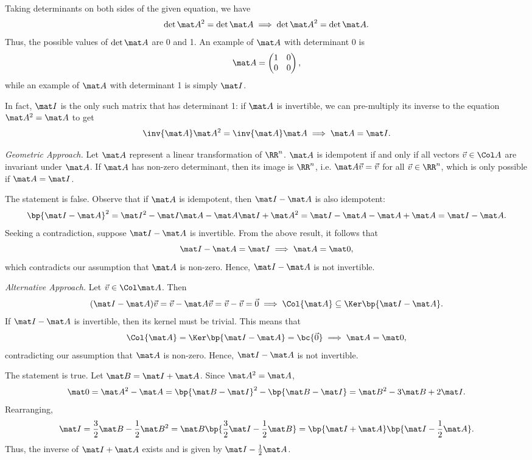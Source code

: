 \begin{solution}
    \begin{ppart}
        Taking determinants on both sides of the given equation, we have \[\det{\mat A^2} = \det{\mat A} \implies \det{\mat A}^2 = \det{\mat A}.\] Thus, the possible values of $\det{\mat A}$ are 0 and 1. An example of $\mat A$ with determinant 0 is \[\mat A = \begin{pmatrix}1 & 0 \\ 0 & 0\end{pmatrix},\] while an example of $\mat A$ with determinant 1 is simply $\mat I$.

        In fact, $\mat I$ is the only such matrix that has determinant 1: if $\mat A$ is invertible, we can pre-multiply its inverse to the equation $\mat A^2 = \mat A$ to get \[\inv{\mat A} \mat A^2 = \inv{\mat A} \mat A \implies \mat A = \mat I.\]
        
        \noindent\textit{Geometric Approach.} Let $\mat A$ represent a linear transformation of $\RR^n$. $\mat A$ is idempotent if and only if all vectors $\vec v \in \Col A$ are invariant under $\mat A$. If $\mat A$ has non-zero determinant, then its image is $\RR^n$, i.e. $\mat A \vec v = \vec v$ for all $\vec v \in \RR^n$, which is only possible if $\mat A = \mat I$.

        \begin{psubpart}
            The statement is false. Observe that if $\mat A$ is idempotent, then $\mat I - \mat A$ is also idempotent: \[\bp{\mat I - \mat A}^2 = \mat I^2 - \mat I \mat A - \mat A \mat I + \mat A^2 = \mat I - \mat A - \mat A + \mat A = \mat I - \mat A.\] Seeking a contradiction, suppose $\mat I - \mat A$ is invertible. From the above result, it follows that \[\mat I - \mat A = \mat I \implies \mat A = \mat 0,\] which contradicts our assumption that $\mat A$ is non-zero. Hence, $\mat I - \mat A$ is not invertible.

            \noindent\textit{Alternative Approach.} Let $\vec v \in \Col \mat A$. Then \[(\mat I - \mat A) \vec v = \vec v - \mat A \vec v = \vec v - \vec v = \vec 0 \implies \Col{\mat A} \subseteq \Ker \bp{\mat I - \mat A}.\] If $\mat I - \mat A$ is invertible, then its kernel must be trivial. This means that \[\Col{\mat A} = \Ker \bp{\mat I - \mat A} = \bc{\vec 0} \implies \mat A = \mat 0,\] contradicting our assumption that $\mat A$ is non-zero. Hence, $\mat I - \mat A$ is not invertible.
        \end{psubpart}
        \begin{psubpart}
            The statement is true. Let $\mat B = \mat I + \mat A$. Since $\mat A^2 = \mat A$, \[\mat 0 = \mat A^2 - \mat A = \bp{\mat B - \mat I}^2 - \bp{\mat B - \mat I} = \mat B^2 - 3\mat B + 2 \mat I.\] Rearranging, \[\mat I = \frac32 \mat B - \frac12 \mat B^2 = \mat B \bp{\frac32 \mat I - \frac12 \mat B} = \bp{\mat I + \mat A} \bp{\mat I - \frac12 \mat A}.\] Thus, the inverse of $\mat I + \mat A$ exists and is given by $\mat I - \frac12 \mat A$.
            

\end{psubpart}
\end{ppart}
\end{solution}
